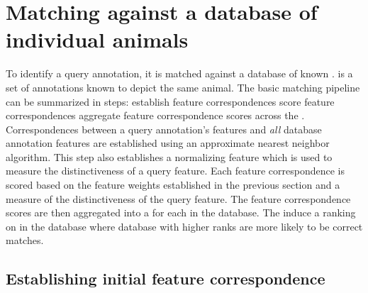 \newcommand{\annotscoreop}{\opname{K_{\tt annot}}}
\newcommand{\amechscoreop}{\opname{K_{\csum}}}
\newcommand{\fmechscoreop}{\opname{K_{\nsum}}}

\section{Matching against a database of individual animals}\label{sec:baselineranking}

    To identify a query annotation, it is matched against a database of known \names{}.
    \Aan{\name{}} is a set of annotations known to depict the same animal.
    The basic matching pipeline can be summarized in \three{} steps:
    establish feature correspondences \rpipe{} %
    score feature correspondences \rpipe{} %
    aggregate feature correspondence scores across the \names{}.
    Correspondences between a query annotation's features and \emph{all} database annotation features are
      established using an approximate nearest neighbor algorithm.
    This step also establishes a normalizing feature which is used to measure the distinctiveness of a query
      feature.
    Each feature correspondence is scored based on the feature weights established in the previous section and a
      measure of the distinctiveness of the query feature.
    The feature correspondence scores are then aggregated into a \glossterm{\namescore{}} for each \name{} in the
      database.
    The \namescores{} induce a ranking on \names{} in the database where database \names{} with higher ranks are
      more likely to be correct matches.

   \subsection{Establishing initial feature correspondence}\label{sub:featmatch}

